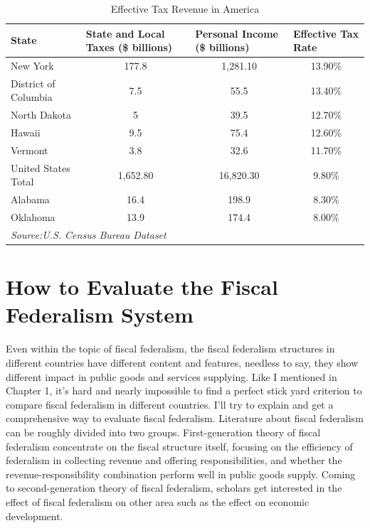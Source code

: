 \begin{table}[H]
    \centering
    \caption{Effective Tax Revenue in America}
      \begin{tabular}{p{9.43em}lll}
      \toprule
      State & \multicolumn{1}{p{8.145em}}{State and Local Taxes (\$ billions)} & \multicolumn{1}{p{7.43em}}{Personal Income (\$ billions)} & \multicolumn{1}{p{9.93em}}{Effective Tax Rate} \\
      \midrule
      New York & \multicolumn{1}{c}{177.8} & \multicolumn{1}{c}{1,281.10} & \multicolumn{1}{c}{13.90\%} \\
      District of Columbia & \multicolumn{1}{c}{7.5} & \multicolumn{1}{c}{55.5} & \multicolumn{1}{c}{13.40\%} \\
      North Dakota & \multicolumn{1}{c}{5} & \multicolumn{1}{c}{39.5} & \multicolumn{1}{c}{12.70\%} \\
      Hawaii & \multicolumn{1}{c}{9.5} & \multicolumn{1}{c}{75.4} & \multicolumn{1}{c}{12.60\%} \\
      Vermont & \multicolumn{1}{c}{3.8} & \multicolumn{1}{c}{32.6} & \multicolumn{1}{c}{11.70\%} \\
      \midrule
      United States Total & \multicolumn{1}{c}{1,652.80} & \multicolumn{1}{c}{16,820.30} & \multicolumn{1}{c}{9.80\%} \\
      \midrule
      Alabama & \multicolumn{1}{c}{16.4} & \multicolumn{1}{c}{198.9} & \multicolumn{1}{c}{8.30\%} \\
      Oklahoma & \multicolumn{1}{c}{13.9} & \multicolumn{1}{c}{174.4} & \multicolumn{1}{c}{8.00\%} \\
      \midrule
      \multicolumn{4}{p{34.935em}}{\textit{Source:U.S. Census Bureau Dataset}} \\
      \end{tabular}%
    \label{Table 2.1}%
  \end{table}%
  
  
\section{How to Evaluate the Fiscal Federalism System}  
Even within the topic of fiscal federalism, the fiscal federalism structures in different countries have different content and features, needless to say, they show different impact in public goods and services supplying. Like I mentioned in Chapter 1, it's hard and nearly impossible to find a perfect stick yard criterion to compare fiscal federalism in different countries. I'll try to explain and get a comprehensive way to evaluate fiscal federalism. Literature about fiscal federalism can be roughly divided into two groups. First-generation theory of fiscal federalism concentrate on the fiscal structure itself, focusing on the efficiency of federalism in collecting revenue and offering responsibilities, and whether the revenue-responsibility combination perform well in public goods supply. Coming to second-generation theory of fiscal federalism, scholars get interested in the effect of fiscal federalism on other area such as the effect on economic development.

